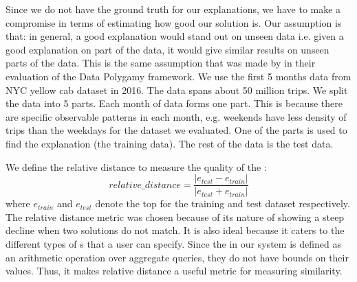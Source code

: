 Since we do not have the ground truth for our explanations, we have to make a compromise in terms of estimating how good our solution is. Our assumption is that: in general, a good explanation would stand out on unseen data i.e. given a good explanation on part of the data, it would give similar results on unseen parts of the data. This is the same assumption that was made by \cite{chirigati2016data} in their evaluation of the Data Polygamy framework. 
We use the first 5 months data from  NYC yellow cab dataset in 2016. The data spans about 50 million trips. 
We split the data into 5 parts. Each month of data forms one part. 
This is because there are specific observable patterns in each month, e.g. weekends have less density of trips than the weekdays for the dataset we evaluated. 
One of the parts is used to find the explanation (the training data). The rest of the data is the test data. 


We define the relative distance to measure the quality of the {\explanation}:
$$relative\_distance = \frac{|e_{test}-e_{train}|}{|e_{test}+e_{train}|}$$
where $e_{train}$ and $e_{test}$ denote the top {\explanation} for the training and test dataset respectively. 
The relative distance metric was chosen because of its nature of showing a steep decline when two solutions do not match. It is also ideal because it caters to the different types of {\fact}s that a user can specify. Since the {\fact} in our system is defined as an arithmetic operation over aggregate queries, they do not have bounds on their values. Thus, it makes relative distance a useful metric for measuring similarity.

